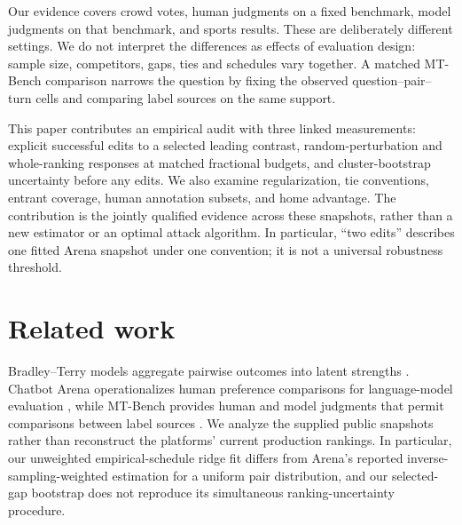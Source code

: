 Our evidence covers crowd votes, human judgments on a fixed benchmark, model judgments on that benchmark, and sports results. These are deliberately different settings. We do not interpret the differences as effects of evaluation design: sample size, competitors, gaps, ties and schedules vary together. A matched MT-Bench comparison narrows the question by fixing the observed question--pair--turn cells and comparing label sources on the same support.

This paper contributes an empirical audit with three linked measurements: explicit successful edits to a selected leading contrast, random-perturbation and whole-ranking responses at matched fractional budgets, and cluster-bootstrap uncertainty before any edits. We also examine regularization, tie conventions, entrant coverage, human annotation subsets, and home advantage. The contribution is the jointly qualified evidence across these snapshots, rather than a new estimator or an optimal attack algorithm. In particular, ``two edits'' describes one fitted Arena snapshot under one convention; it is not a universal robustness threshold.

\section{Related work}
\label{sec:related}
Bradley--Terry models aggregate pairwise outcomes into latent strengths \citep{chiang2024arena}. Chatbot Arena operationalizes human preference comparisons for language-model evaluation \citep{chiang2024arena}, while MT-Bench provides human and model judgments that permit comparisons between label sources \citep{zheng2023judging}. We analyze the supplied public snapshots rather than reconstruct the platforms' current production rankings. In particular, our unweighted empirical-schedule ridge fit differs from Arena's reported inverse-sampling-weighted estimation for a uniform pair distribution, and our selected-gap bootstrap does not reproduce its simultaneous ranking-uncertainty procedure.

